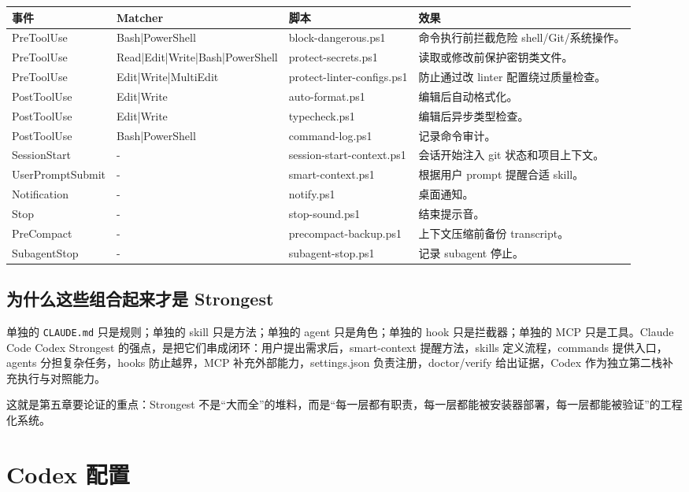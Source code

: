 \documentclass[11pt,a4paper]{ctexbook}
\begin{document}
\begin{longtable}{p{}p{}p{}p{}}
\toprule
事件 & Matcher & 脚本 & 效果 \\
\midrule
PreToolUse & Bash|PowerShell & block-dangerous.ps1 & 命令执行前拦截危险 shell/Git/系统操作。 \\
PreToolUse & Read|Edit|Write|Bash|PowerShell & protect-secrets.ps1 & 读取或修改前保护密钥类文件。 \\
PreToolUse & Edit|Write|MultiEdit & protect-linter-configs.ps1 & 防止通过改 linter 配置绕过质量检查。 \\
PostToolUse & Edit|Write & auto-format.ps1 & 编辑后自动格式化。 \\
PostToolUse & Edit|Write & typecheck.ps1 & 编辑后异步类型检查。 \\
PostToolUse & Bash|PowerShell & command-log.ps1 & 记录命令审计。 \\
SessionStart & - & session-start-context.ps1 & 会话开始注入 git 状态和项目上下文。 \\
UserPromptSubmit & - & smart-context.ps1 & 根据用户 prompt 提醒合适 skill。 \\
Notification & - & notify.ps1 & 桌面通知。 \\
Stop & - & stop-sound.ps1 & 结束提示音。 \\
PreCompact & - & precompact-backup.ps1 & 上下文压缩前备份 transcript。 \\
SubagentStop & - & subagent-stop.ps1 & 记录 subagent 停止。 \\
\bottomrule
\end{longtable}

\section{为什么这些组合起来才是 Strongest}

单独的 \texttt{CLAUDE.md} 只是规则；单独的 skill 只是方法；单独的 agent 只是角色；单独的 hook 只是拦截器；单独的 MCP 只是工具。Claude Code Codex Strongest 的强点，是把它们串成闭环：用户提出需求后，smart-context 提醒方法，skills 定义流程，commands 提供入口，agents 分担复杂任务，hooks 防止越界，MCP 补充外部能力，settings.json 负责注册，doctor/verify 给出证据，Codex 作为独立第二栈补充执行与对照能力。

这就是第五章要论证的重点：Strongest 不是“大而全”的堆料，而是“每一层都有职责，每一层都能被安装器部署，每一层都能被验证”的工程化系统。

\chapter{Codex 配置}
\end{document}
